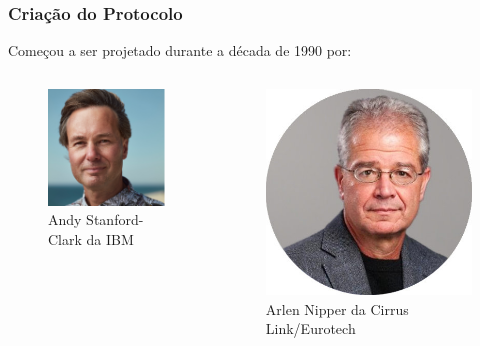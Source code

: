 \documentclass[12pt]{beamer}
\begin{document}
\begin{frame}
    \frametitle{Criação do Protocolo}
    Começou a ser projetado durante a década de 1990 por:
    \begin{columns}[c]
        \begin{column}{.5\textwidth}
            \begin{figure}[!htb]
                \centering
                \includegraphics[width=.75\textwidth]{andy_stanford_clark1}
                \caption{\label{fig:andy}Andy Stanford-Clark da IBM}
            \end{figure}
        \end{column}
        \begin{column}{.5\textwidth}
            \begin{figure}[!htb]
                \centering
                \includegraphics[width=.77\textwidth]{arlen_nipper1}
                \caption{\label{fig:arlen}Arlen Nipper da Cirrus Link/Eurotech}
            \end{figure}
        \end{column}
    \end{columns}
\end{frame}
\end{document}
